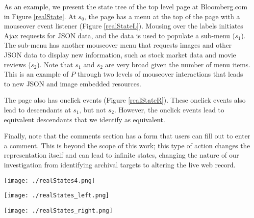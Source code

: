 \documentclass{sig-alternate}
\begin{document}
As an example, we present the state tree of the top level page at Bloomberg.com in Figure \ref{realState}. At $s_0$, the page has a menu at the top of the page with a mouseover event listener (Figure \ref{realStateL}). Mousing over the labels initiates Ajax requests for JSON data, and the data is used to populate a sub-menu ($s_1$). The sub-menu has another mouseover menu that requests images and other JSON data to display new information, such as stock market data and movie reviews ($s_2$). Note that $s_1$ and $s_2$ are very broad given the number of menu items. This is an example of $P$ through two levels of mouseover interactions that leads to new JSON and image embedded resources. 

The page also has onclick events (Figure \ref{realStateR}). These onclick events also lead to descendants at $s_1$, but not $s_2$. However, the onclick events lead to equivalent descendants that we identify as equivalent.

Finally, note that the comments section has a form that users can fill out to enter a comment. This is beyond the scope of this work; this type of action changes the representation itself and can lead to infinite states, changing the nature of our investigation from identifying archival targets to altering the live web record.



\begin{figure*}[hp]
\centering
\texttt{[image: ./realStates4.png]}
\caption{Example state tree of \texttt{http://www.bloomberg.com/bw/articles/2014-06-16/open -plan-offices-for-people-who-hate-open-plan-offices}. Mouseover events lead to multiple descendants at $s_1$ and further mouseover events lead to descendants at $s_2$, each requiring Ajax requests for JSON and image resources. Figures \ref{realStateL} and \ref{realStateR} provide closer views of this figure.}
\label{realState}
\end{figure*}


\begin{figure*}[hp]
\centering
\texttt{[image: ./realStates\_left.png]}
\caption{This figure highlights the menu and submenu descendants from the left side of Figure \ref{realState}.}
\label{realStateL}
\end{figure*}


\begin{figure*}[hp]
\centering
\texttt{[image: ./realStates\_right.png]}
\caption{This figure highlights the descendants created though click events from the right side of Figure \ref{realState}.}
\label{realStateR}
\end{figure*}
\end{document}
